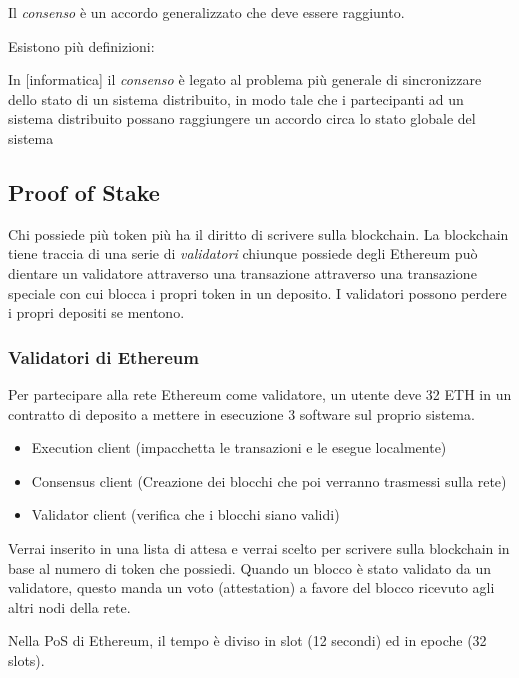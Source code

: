 \documentclass[a4paper]{article}
\begin{document}
\begin{definition}
    Il \textit{consenso} è un accordo generalizzato che deve essere raggiunto.
\end{definition}
\noindent
Esistono più definizioni:
\begin{definition}
    In [informatica] il \textit{consenso} è legato al problema più generale di sincronizzare dello stato di un sistema distribuito, in modo tale che i partecipanti ad un sistema
    distribuito possano raggiungere un accordo circa lo stato globale del sistema
\end{definition}

\subsection{Proof of Stake}

Chi possiede più token più ha il diritto di scrivere sulla blockchain.
La blockchain tiene traccia di una serie di \textit{validatori} chiunque possiede degli Ethereum può dientare un validatore attraverso una transazione attraverso una transazione speciale
con cui blocca i propri token in un deposito. 
I validatori possono perdere i propri depositi se mentono.

\subsubsection{Validatori di Ethereum}

Per partecipare alla rete Ethereum come validatore, un utente deve 32 ETH in un contratto di deposito a mettere in esecuzione 3 software sul proprio sistema.
\begin{itemize}
    \item Execution client (impacchetta le transazioni e le esegue localmente)
    \item Consensus client (Creazione dei blocchi che poi verranno trasmessi sulla rete)
    \item Validator client (verifica che i blocchi siano validi)
\end{itemize}
Verrai inserito in una lista di attesa e verrai scelto per scrivere sulla blockchain in base al numero di token che possiedi.
Quando un blocco è stato validato da un validatore, questo manda un voto (attestation) a favore del blocco ricevuto agli altri nodi della rete.

\vspace{1em}
\noindent
Nella PoS di Ethereum, il tempo è diviso in slot (12 secondi) ed in epoche (32 slots).
\end{document}
